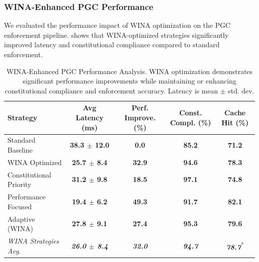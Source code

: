 \documentclass[manuscript,screen,review,anonymous,9pt]{acmart}
\newcommand{\tablesize}{\footnotesize} %
\newcommand{\tablenumfmt}[1]{\textbf{#1}}
\newcommand{\tableheader}[1]{\textbf{#1}}
\begin{document}
\subsubsection{WINA-Enhanced PGC Performance}
\label{subsubsec:wina_performance_evaluation}
We evaluated the performance impact of WINA optimization on the PGC enforcement pipeline.  shows that WINA-optimized strategies significantly improved latency and constitutional compliance compared to standard enforcement.
\begin{table}[htbp]
\centering
\caption{WINA-Enhanced PGC Performance Analysis. WINA optimization demonstrates significant performance improvements while maintaining or enhancing constitutional compliance and enforcement accuracy. Latency is mean $\pm$ std. dev.}
\label{tab:wina_pgc_performance}
\tablesize
\begin{tabular}{@{}lcccc@{}}
\toprule
\tableheader{Strategy} & \tableheader{Avg Latency (ms)} & \tableheader{Perf. Improve. (\%)} & \tableheader{Const. Compl. (\%)} & \tableheader{Cache Hit (\%)} \\
\midrule
Standard Baseline     & \tablenumfmt{38.3 $\pm$ 12.0} & \tablenumfmt{0.0}    & \tablenumfmt{85.2} & \tablenumfmt{71.2} \\
WINA Optimized        & \tablenumfmt{25.7 $\pm$ 8.4}  & \tablenumfmt{32.9}   & \tablenumfmt{94.6} & \tablenumfmt{78.3} \\
Constitutional Priority & \tablenumfmt{31.2 $\pm$ 9.8}  & \tablenumfmt{18.5}   & \tablenumfmt{97.1} & \tablenumfmt{74.8} \\
Performance Focused   & \tablenumfmt{19.4 $\pm$ 6.2}  & \tablenumfmt{49.3}   & \tablenumfmt{91.7} & \tablenumfmt{82.1} \\
Adaptive (WINA)       & \tablenumfmt{27.8 $\pm$ 9.1}  & \tablenumfmt{27.4}   & \tablenumfmt{95.3} & \tablenumfmt{79.6} \\
\midrule
\textit{WINA Strategies Avg.} & \textit{\tablenumfmt{26.0 $\pm$ 8.4}} & \textit{\tablenumfmt{32.0}} & \textit{\tablenumfmt{94.7}} & \textit{\tablenumfmt{78.7}}\textsuperscript{*} \\
\bottomrule
\end{tabular}

\end{table}
\end{document}
